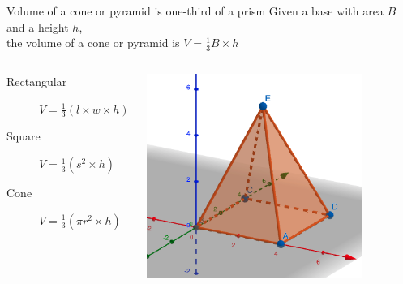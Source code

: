 \documentclass[onlytextwidth, aspectratio=169]{beamer}
\begin{document}
\begin{frame}{Volume of a cone or pyramid is one-third of a prism} 
  Given a base with area $B$ and a height $h$, \\
  the volume of a cone or pyramid is $V= \frac{1}{3} B \times h$
  \vspace{0.5cm}
  \begin{columns}
    \begin{description}
      \item[Rectangular] $V= \frac{1}{3} (l \times w \times h)$
      \item[Square] $V= \frac{1}{3} (s^2 \times h)$
      \item[Cone] $V= \frac{1}{3} (\pi r^2 \times h)$ 
    \end{description}
    \includegraphics[width=0.8\textwidth]{../graphics/04pyramid.png}
  \end{columns} \vspace{0.5cm}
  \end{frame}
\end{document}
